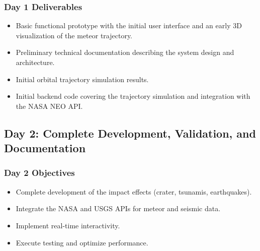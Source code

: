 \documentclass[conference]{IEEEtran}
\begin{document}
\subsubsection*{Day 1 Deliverables}
\begin{itemize}
	\item Basic functional prototype with the initial user interface and an early
	      3D visualization of the meteor trajectory.
	\item Preliminary technical documentation describing the system design and
	      architecture.
	\item Initial orbital trajectory simulation results.
	\item Initial backend code covering the trajectory simulation and integration
	      with the NASA NEO API.
\end{itemize}


\subsection{Day 2: Complete Development, Validation, and Documentation}
\subsubsection*{Day 2 Objectives}
\begin{itemize}
	\item Complete development of the impact effects (crater, tsunamis,
	      earthquakes).
	\item Integrate the NASA and USGS APIs for meteor and seismic data.
	\item Implement real-time interactivity.
	\item Execute testing and optimize performance.
\end{itemize}
\end{document}
